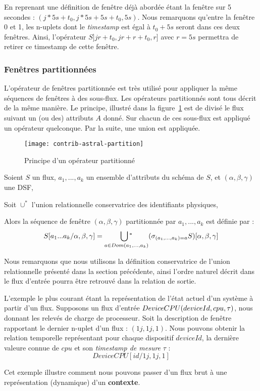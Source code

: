 \begin{example}
    En reprenant une définition de fenêtre déjà abordée étant la fenêtre sur 5 secondes : $(j*5s+t_0,j*5s+5s+t_0,5s)$. Nous remarquons qu'entre la fenêtre 0 et 1, les n-uplets dont le \textit{timestamp} est égal à $t_0+5s$ seront dans ces deux fenêtres. Ainsi, l'opérateur $S]jr+t_0,jr+r+t_0,r]$ avec $r=5s$ permettra de retirer ce timestamp de cette fenêtre.
\end{example}


\subsubsection{Fenêtres partitionnées}
L'opérateur de fenêtres partitionnée est très utilisé pour appliquer la même séquences de fenêtres à des sous-flux. Les opérateurs partitionnés sont tous décrit de la même manière. Le principe, illustré dans la figure~\ref{fig:contrib:astral:partition} est de divisé le flux suivant un (ou des) attributs $A$ donné. Sur chacun de ces sous-flux est appliqué un opérateur quelconque. Par la suite, une union est appliquée.
\begin{figure}[ht]
	\centering
	\texttt{[image: contrib-astral-partition]}
	\caption{Principe d'un opérateur partitionné}\label{fig:contrib:astral:partition}
\end{figure}
\begin{defi}
	Soient $S$ un flux, $a_1,...,a_k$ un ensemble d'attributs du schéma de $S$, et $(\alpha,\beta,\gamma)$ une DSF,
	
	Soit $\cup^*$ l'union relationnelle conservatrice des identifiants physiques, 

	Alors la séquence de fenêtre $(\alpha,\beta,\gamma)$ partitionnée par $a_1,...,a_k$ est définie par :
	$$S[a_1...a_k/\alpha,\beta,\gamma] = \mathop{\bigcup\null^*}_{a\in Dom(a_1,...,a_k)} (\sigma_{(a_1,...,a_k)=a} S)[\alpha,\beta,\gamma]$$
\end{defi}

Nous remarquons que nous utilisons la définition conservatrice de l'union relationnelle présenté dans la section précédente, ainsi l'ordre naturel décrit dans le flux d'entrée pourra être retrouvé dans la relation de sortie.
\begin{example}
	L'exemple le plus courant étant la représentation de l'état actuel d'un système à partir d'un flux. Supposons un flux d'entrée $DeviceCPU(deviceId,cpu,\tau)$, nous donnant les relevés de charge de processeur. Soit la description de fenêtre rapportant le dernier n-uplet d'un flux : $(1j,1j,1)$. Nous pouvons obtenir la relation temporelle représentant pour chaque dispositif $deviceId$, la dernière valeure connue de $cpu$ et son \textit{timestamp de mesure} $\tau$ : $$DeviceCPU[id/1j,1j,1]$$

	Cet exemple illustre comment nous pouvons passer d'un flux brut à une représentation (dynamique) d'un \textbf{contexte}.
\end{example}

